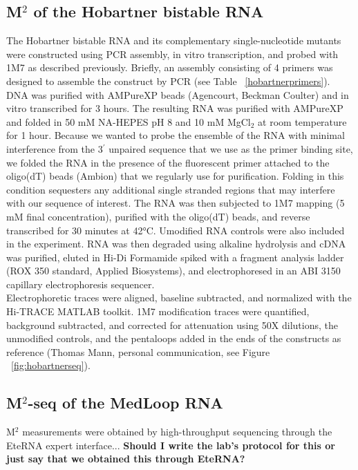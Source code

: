 \documentclass[12pt]{article}
\begin{document}
\subsection{M$^2$ of the Hobartner bistable RNA}

The Hobartner bistable RNA and its complementary single-nucleotide mutants were constructed using PCR assembly, in vitro transcription, and probed with 1M7 as described previously. 
Briefly, an assembly consisting of 4 primers was designed to assemble the construct by PCR (see Table ~\ref{hobartnerprimers}). 
DNA was purified with AMPureXP beads (Agencourt, Beckman Coulter) and in vitro transcribed for 3 hours. 
The resulting RNA was purified with AMPureXP and folded in 50 mM NA-HEPES pH 8 and 10 mM MgCl$_{2}$ at room temperature for 1 hour. 
Because we wanted to probe the ensemble of the RNA with minimal interference from the 3$^{\prime}$ unpaired sequence that we use as the primer binding site, we folded the RNA in the presence of the fluorescent primer attached to the oligo(dT) beads (Ambion) that we regularly use for purification. 
Folding in this condition sequesters any additional single stranded regions that may interfere with our sequence of interest. 
The RNA was then subjected to 1M7 mapping (5 mM final concentration), purified with the oligo(dT) beads, and reverse transcribed for 30 minutes at 42°C. Umodified RNA controls were also included in the experiment. 
RNA was then degraded using alkaline hydrolysis and cDNA was purified, eluted in Hi-Di Formamide spiked with a fragment analysis ladder (ROX 350 standard, Applied Biosystems), and electrophoresed in an ABI 3150 capillary electrophoresis sequencer. \\
Electrophoretic traces were aligned, baseline subtracted, and normalized with the Hi-TRACE MATLAB toolkit. 1M7 modification traces were quantified, background subtracted, and corrected for attenuation using 50X dilutions, the unmodified controls, and the pentaloops added in the ends of the constructs as reference (Thomas Mann, personal communication, see Figure ~\ref{fig:hobartnerseq}).

\subsection{M$^2$-seq of the MedLoop RNA}
M$^2$ measurements were obtained by high-throughput sequencing through the EteRNA expert interface... \textbf{Should I write the lab's protocol for this or just say that we obtained this through EteRNA?}
\end{document}
